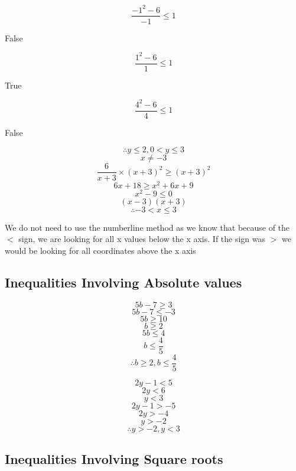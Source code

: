 \documentclass{report}
\begin{document}
$$\frac{-1^{2}-6}{-1} \leq 1$$
\begin{center}
    False
\end{center}
$$\frac{1^{2}-6}{1} \leq 1$$
\begin{center}
    True
\end{center}
$$\frac{4^{2}-6}{4} \leq 1$$
\begin{center}
    False
\end{center}
$$\therefore y \leq 2 , 0<y\leq3$$
$$x \neq -3$$
$$\frac{6}{x+3} \times (x+3)^{2} \geq (x+3)^{2}$$
$$6x+18 \geq x^{2}+6x+9$$
$$x^{2}-9 \leq 0$$
$$(x-3)(x+3)$$
$$\therefore -3 < x \leq 3$$
\begin{note}
    We do not need to use the numberline method as we know that because of the $<$ sign, we are looking for all x values below the x axis.
    \newline 
    If the sign was $>$ we would be looking for all coordinates above the x  axis 
\end{note}

\subsection{Inequalities Involving Absolute values}
$$5b-7 \geq 3$$
$$5b-7 \leq -3$$
$$5b \geq 10$$
$$b \geq 2$$
$$5b \leq 4$$
$$b \leq \frac{4}{5}$$
$$\therefore b \geq 2, b \leq \frac{4}{5}$$


$$2y-1 < 5$$
$$2y < 6$$
$$y < 3$$
$$2y-1 > -5$$
$$2y > -4$$
$$y > -2$$
$$\therefore y>-2, y < 3$$






\subsection{Inequalities Involving Square roots}
\qs{}{\begin{center} \end{center}}
\qs{}{\begin{center} \end{center}}
\end{document}
